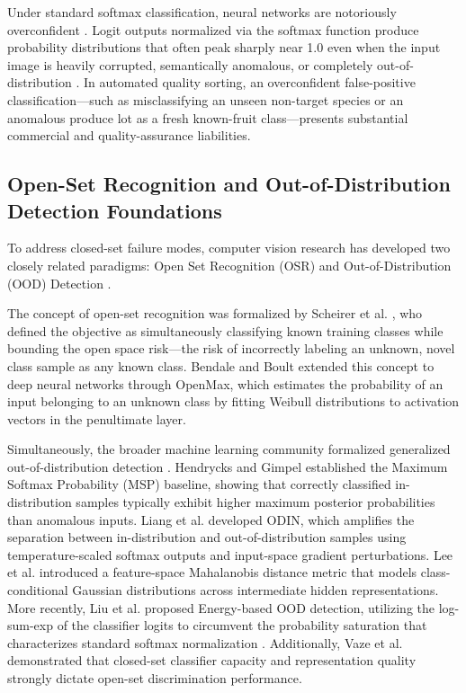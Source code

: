 Under standard softmax classification, neural networks are notoriously overconfident \cite{guo2017calibration}. Logit outputs normalized via the softmax function produce probability distributions that often peak sharply near 1.0 even when the input image is heavily corrupted, semantically anomalous, or completely out-of-distribution \cite{guo2017calibration,hendrycks2017baseline}. In automated quality sorting, an overconfident false-positive classification---such as misclassifying an unseen non-target species or an anomalous produce lot as a fresh known-fruit class---presents substantial commercial and quality-assurance liabilities.

\subsection{Open-Set Recognition and Out-of-Distribution Detection Foundations}
\label{sec:osr_ood_foundations}
To address closed-set failure modes, computer vision research has developed two closely related paradigms: Open Set Recognition (OSR) \cite{scheirer2013toward,bendale2016towards} and Out-of-Distribution (OOD) Detection \cite{hendrycks2017baseline,yang2024generalized}. 

The concept of open-set recognition was formalized by Scheirer et al. \cite{scheirer2013toward}, who defined the objective as simultaneously classifying known training classes while bounding the open space risk---the risk of incorrectly labeling an unknown, novel class sample as any known class. Bendale and Boult \cite{bendale2016towards} extended this concept to deep neural networks through OpenMax, which estimates the probability of an input belonging to an unknown class by fitting Weibull distributions to activation vectors in the penultimate layer.

Simultaneously, the broader machine learning community formalized generalized out-of-distribution detection \cite{hendrycks2017baseline,yang2024generalized}. Hendrycks and Gimpel \cite{hendrycks2017baseline} established the Maximum Softmax Probability (MSP) baseline, showing that correctly classified in-distribution samples typically exhibit higher maximum posterior probabilities than anomalous inputs. Liang et al. \cite{liang2018enhancing} developed ODIN, which amplifies the separation between in-distribution and out-of-distribution samples using temperature-scaled softmax outputs and input-space gradient perturbations. Lee et al. \cite{lee2018simple} introduced a feature-space Mahalanobis distance metric that models class-conditional Gaussian distributions across intermediate hidden representations. More recently, Liu et al. \cite{liu2020energy} proposed Energy-based OOD detection, utilizing the log-sum-exp of the classifier logits to circumvent the probability saturation that characterizes standard softmax normalization \cite{yang2024generalized,liu2020energy}. Additionally, Vaze et al. \cite{vaze2022open} demonstrated that closed-set classifier capacity and representation quality strongly dictate open-set discrimination performance.

